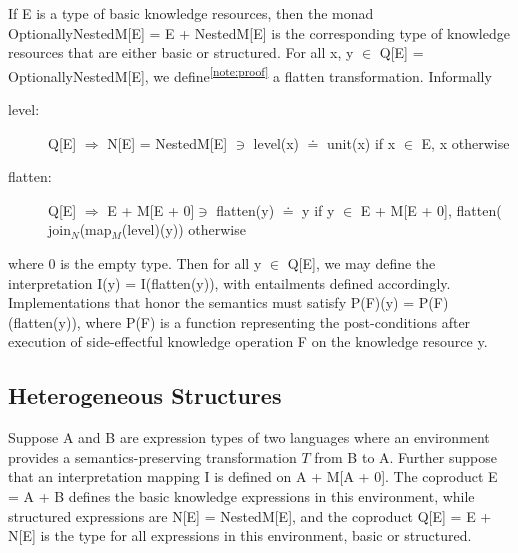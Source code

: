 \documentclass[runningheads]{llncs}
\begin{document}
If E is a type of basic knowledge resources, then the monad
OptionallyNestedM[E] = E + NestedM[E] is the corresponding type of knowledge resources that are either basic or structured.
For all x, y $\in$ Q[E] = OptionallyNestedM[E], we define\textsuperscript{\ref{note:proof}}  a flatten transformation. Informally
\begin{description}
\item[level:] Q[E] $\Rightarrow$ N[E] = NestedM[E]
 $\ni$ level(x) $\doteq$ unit(x) if x $\in$ E,  x otherwise
\item[flatten:] Q[E] $\Rightarrow$ E + M[E + 0]$\ni$ flatten(y)   $\doteq$ y if y $\in$  E + M[E + 0], \newline flatten( join$_N$(map$_M$(level)(y)) otherwise
\end{description}
\noindent where 0 is the empty type.
Then for all y $\in$ Q[E], we may define the interpretation I(y) = I(flatten(y)), with entailments defined accordingly. %
Implementations that honor the semantics must satisfy P(F)(y) = P(F)(flatten(y)), where P(F) is a function representing the post-conditions after execution of side-effectful knowledge operation F on the knowledge resource y.


\vspace{-0.3cm}
\subsection{Heterogeneous Structures}
Suppose A and B are expression types of two languages where an environment provides a semantics-preserving transformation $T$ from B to A.
Further suppose that an interpretation mapping I is defined on A + M[A + 0].
The coproduct E = A + B defines the basic knowledge expressions in this environment, while structured expressions are N[E] = NestedM[E], and
the coproduct Q[E] = E + N[E] is the type for all expressions in this environment, basic or structured. 
\end{document}
